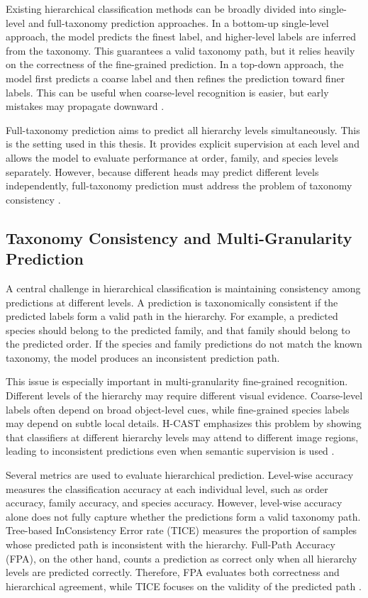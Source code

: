 Existing hierarchical classification methods can be broadly divided into single-level and full-taxonomy prediction approaches. In a bottom-up single-level approach, the model predicts the finest label, and higher-level labels are inferred from the taxonomy. This guarantees a valid taxonomy path, but it relies heavily on the correctness of the fine-grained prediction. In a top-down approach, the model first predicts a coarse label and then refines the prediction toward finer labels. This can be useful when coarse-level recognition is easier, but early mistakes may propagate downward \cite{park2025visually}.

Full-taxonomy prediction aims to predict all hierarchy levels simultaneously. This is the setting used in this thesis. It provides explicit supervision at each level and allows the model to evaluate performance at order, family, and species levels separately. However, because different heads may predict different levels independently, full-taxonomy prediction must address the problem of taxonomy consistency \cite{park2025visually}.

\subsection{Taxonomy Consistency and Multi-Granularity Prediction}

A central challenge in hierarchical classification is maintaining consistency among predictions at different levels. A prediction is taxonomically consistent if the predicted labels form a valid path in the hierarchy. For example, a predicted species should belong to the predicted family, and that family should belong to the predicted order. If the species and family predictions do not match the known taxonomy, the model produces an inconsistent prediction path.

This issue is especially important in multi-granularity fine-grained recognition. Different levels of the hierarchy may require different visual evidence. Coarse-level labels often depend on broad object-level cues, while fine-grained species labels may depend on subtle local details. H-CAST emphasizes this problem by showing that classifiers at different hierarchy levels may attend to different image regions, leading to inconsistent predictions even when semantic supervision is used \cite{park2025visually}.

Several metrics are used to evaluate hierarchical prediction. Level-wise accuracy measures the classification accuracy at each individual level, such as order accuracy, family accuracy, and species accuracy. However, level-wise accuracy alone does not fully capture whether the predictions form a valid taxonomy path. Tree-based InConsistency Error rate (TICE) measures the proportion of samples whose predicted path is inconsistent with the hierarchy. Full-Path Accuracy (FPA), on the other hand, counts a prediction as correct only when all hierarchy levels are predicted correctly. Therefore, FPA evaluates both correctness and hierarchical agreement, while TICE focuses on the validity of the predicted path \cite{park2025visually}.

